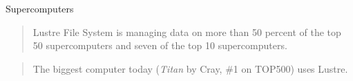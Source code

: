\begin{frame}{Supercomputers}
    \begin{quote}
        Lustre File System is managing data on more than 50 percent of the top
        50 supercomputers and seven of the top 10 supercomputers.

        \hspace*{}
    \end{quote}

    \vspace{1cm}

    \begin{quote}
        The biggest computer today (\emph{Titan} by Cray, \#1 on TOP500) uses Lustre.
    \end{quote}
\end{frame}
